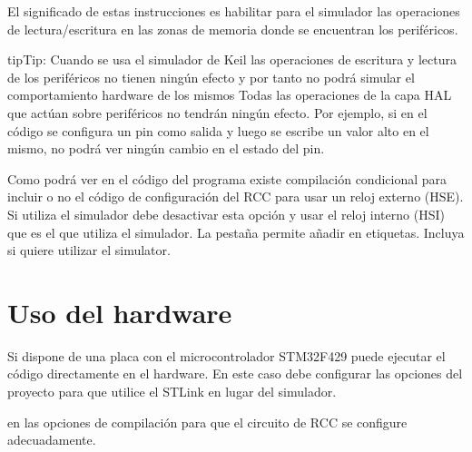 \documentclass[letterpaper,10pt,english]{sphinxmanual}
\begin{document}
\begin{sphinxVerbatim}[commandchars=\\\{\},numbers=left,firstnumber=1,stepnumber=1]
\end{sphinxVerbatim}

\sphinxAtStartPar
El significado de estas instrucciones es habilitar para el simulador las operaciones de lectura/escritura en las zonas de memoria donde se encuentran los periféricos.

\begin{sphinxadmonition}{tip}{Tip:}
\sphinxAtStartPar
Cuando se usa el simulador de Keil las operaciones de escritura y lectura de los periféricos no tienen ningún efecto y por tanto no podrá simular el comportamiento hardware de los mismos
Todas las operaciones de la capa HAL que actúan sobre periféricos no tendrán ningún efecto. Por ejemplo, si en el código se configura un pin como salida y luego se escribe un valor alto en el mismo, no podrá ver ningún cambio en el estado del pin.
\end{sphinxadmonition}

\sphinxAtStartPar
Como podrá ver en el código del programa  existe compilación condicional para incluir o no el código de configuración del RCC para usar un reloj externo (HSE).
Si utiliza el simulador debe desactivar esta opción y usar el reloj interno (HSI) que es el que utiliza el simulador. La pestaña  permite añadir en  etiquetas. Incluya  si quiere utilizar el simulator.


\section{Uso del hardware}
\label{\detokenize{cmsis-rtos:uso-del-hardware}}
\sphinxAtStartPar
Si dispone de una placa con el microcontrolador STM32F429 puede ejecutar el código directamente en el hardware. En este caso debe configurar las opciones del proyecto para que utilice el ST\sphinxhyphen{}Link en lugar del simulador.

\sphinxAtStartPar
{}  en las opciones de compilación para que el circuito de RCC se configure adecuadamente.
\end{document}
